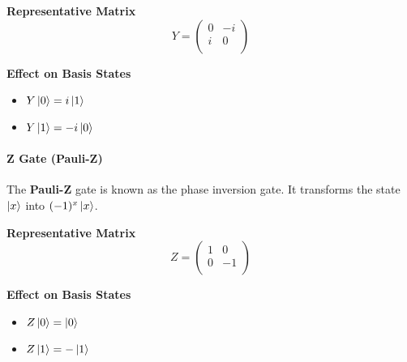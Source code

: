 \vspace{0.5em}

\begin{minipage}{\textwidth}
    \begin{minipage}[t]{0.45\textwidth}
        \centering
        \textbf{Representative Matrix}\\[0.5em]
        \[
        Y = 
        \begin{pmatrix}
        0 & -i \\
        i & 0 \\
        \end{pmatrix}
        \]
    \end{minipage}
    \hfill
    \begin{minipage}[t]{0.45\textwidth}
        \centering
        \textbf{Effect on Basis States}\\[0.5em]
        \begin{itemize}
            \item $Y\ket{0} = i\ket{1}$
            \item $Y\ket{1} = -i\ket{0}$
        \end{itemize}
    \end{minipage}
\end{minipage}

\paragraph{Z Gate (Pauli-Z)}

The \textbf{Pauli-Z} gate is known as the phase inversion gate. It transforms the state $\ket{x}$ into $(-1)^x\ket{x}$.

\vspace{0.5em}
\begin{minipage}{\textwidth}
    \begin{minipage}[t]{0.45\textwidth}
        \centering
        \textbf{Representative Matrix}\\[0.5em]
        \[
        Z = 
        \begin{pmatrix}
        1 & 0 \\
        0 & -1 \\
        \end{pmatrix}
        \]
    \end{minipage}
    \hfill
    \begin{minipage}[t]{0.45\textwidth}
        \centering
        \textbf{Effect on Basis States}\\[0.5em]
        \begin{itemize}
            \item $Z\ket{0} = \ket{0}$
            \item $Z\ket{1} = -\ket{1}$
        \end{itemize}
    \end{minipage}
\end{minipage}



